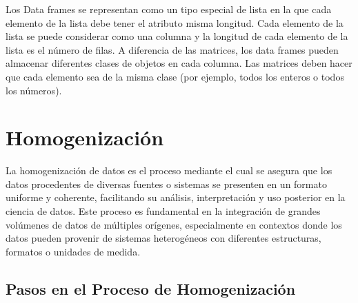 \documentclass[
  us-letterpaper,
]{scrreprt}
\theoremstyle{plain}
\theoremstyle{plain}
\theoremstyle{definition}
\theoremstyle{remark}
\begin{document}
Los Data frames se representan como un tipo especial de lista en la que
cada elemento de la lista debe tener el atributo misma longitud. Cada
elemento de la lista se puede considerar como una columna y la longitud
de cada elemento de la lista es el número de filas. A diferencia de las
matrices, los data frames pueden almacenar diferentes clases de objetos
en cada columna. Las matrices deben hacer que cada elemento sea de la
misma clase (por ejemplo, todos los enteros o todos los números).

\section{Homogenización}\label{homogenizaciuxf3n}

La homogenización de datos es el proceso mediante el cual se asegura que
los datos procedentes de diversas fuentes o sistemas se presenten en un
formato uniforme y coherente, facilitando su análisis, interpretación y
uso posterior en la ciencia de datos. Este proceso es fundamental en la
integración de grandes volúmenes de datos de múltiples orígenes,
especialmente en contextos donde los datos pueden provenir de sistemas
heterogéneos con diferentes estructuras, formatos o unidades de medida.

\subsection{Pasos en el Proceso de
Homogenización}\label{pasos-en-el-proceso-de-homogenizaciuxf3n}
\end{document}
